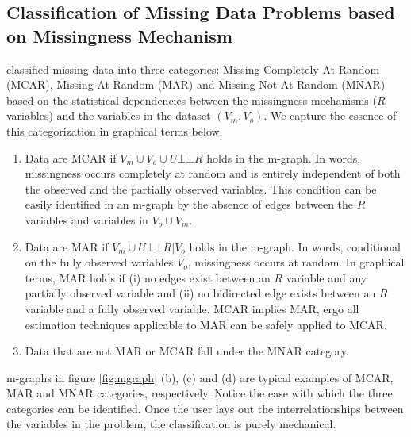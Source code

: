 \documentclass[12pt]{article}
\newcommand{\compos}{\mbox{$\bot\!\!\!\bot$}}
\begin{document}
\subsection{Classification of Missing Data Problems based on Missingness Mechanism}
\label{sec:mechanism}

\cite{Rubin_missing} 
 classified missing data into three categories: Missing Completely At Random (MCAR), Missing At Random (MAR) and Missing Not At Random (MNAR)  based on the statistical dependencies between the missingness mechanisms ($R$ variables) and the variables in the dataset $(V_m,V_o)$. We capture the essence of this categorization in graphical terms below.
\begin{enumerate}
	\item Data are MCAR if $V_m \cup V_o \cup U \compos R$ holds in the m-graph. In  words,  missingness occurs completely at random and is entirely independent of both the observed and the partially observed variables. This condition can be easily identified in an m-graph by the absence of edges between the $R$ variables and variables in $V_o \cup V_m$. 
	\item Data are MAR if  $V_m \cup U \compos R|V_o$ holds in the m-graph. In words, conditional on the fully observed variables $V_o$, missingness occurs
	at random. In graphical terms, MAR holds if (i) no edges exist between an $R$ variable and any partially observed variable and (ii) no bidirected edge exists between an $R$ variable and a fully observed variable.  MCAR implies MAR, ergo all estimation techniques applicable to MAR can be safely  applied to MCAR. 
	\item Data that are not MAR or MCAR fall under the MNAR category. 
\end{enumerate}
m-graphs in figure \ref{fig:mgraph} (b), (c) and (d) are typical examples of MCAR, MAR and MNAR categories, respectively. Notice the ease with which the three categories can be identified. Once the user lays out the interrelationships between the variables in the problem, the classification is purely mechanical. 
\end{document}

